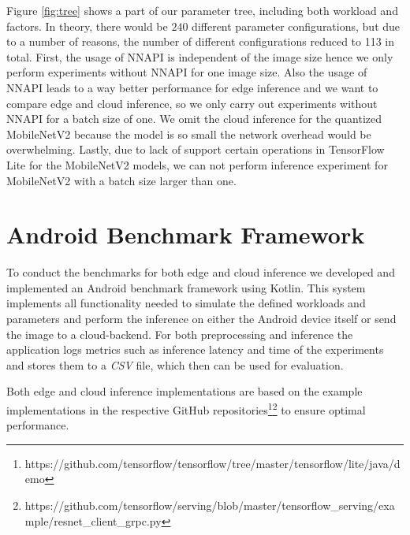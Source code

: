 \vspace{15pt}
Figure \ref{fig:tree} shows a part of our parameter tree, including both workload and factors. In theory, there would be $240$ different parameter configurations, but due to a number of reasons, the number of different configurations reduced to 113 in total.
First, the usage of NNAPI is independent of the image size hence we only perform experiments without NNAPI for one image size. Also the usage of NNAPI leads to a way better performance for edge inference and we want to compare edge and cloud inference, so we only carry out experiments without NNAPI for a batch size of one.
We omit the cloud inference for the quantized MobileNetV2 because the model is so small the network overhead would be overwhelming.
Lastly, due to lack of support certain operations in TensorFlow Lite for the MobileNetV2 models, we can not perform inference experiment for MobileNetV2 with a batch size larger than one.

\section{Android Benchmark Framework}
\label{chap:androidApp}
To conduct the benchmarks for both edge and cloud inference we developed and implemented an Android benchmark framework using Kotlin.
This system implements all functionality needed to simulate the defined workloads and parameters and perform the inference on either the Android device itself or send the image to a cloud-backend.
For both preprocessing and inference the application logs metrics such as inference latency and time of the experiments and stores them to a \emph{CSV} file, which then can be used for evaluation.

Both edge and cloud inference implementations are based on the example implementations in the respective GitHub repositories\footnote{https://github.com/tensorflow/tensorflow/tree/master/tensorflow/lite/java/demo}\footnote{https://github.com/tensorflow/serving/blob/master/tensorflow\_serving/example/resnet\_client\_grpc.py} to ensure optimal performance. 


